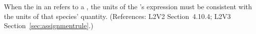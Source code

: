 When the  in an \InitialAssignment refers to a \Species,
the units of the \InitialAssignment's  expression must be
consistent with the units of that species' quantity.  (References:
L2V2 Section~4.10.4; L2V3 Section~\ref{sec:assignmentrule}.)

